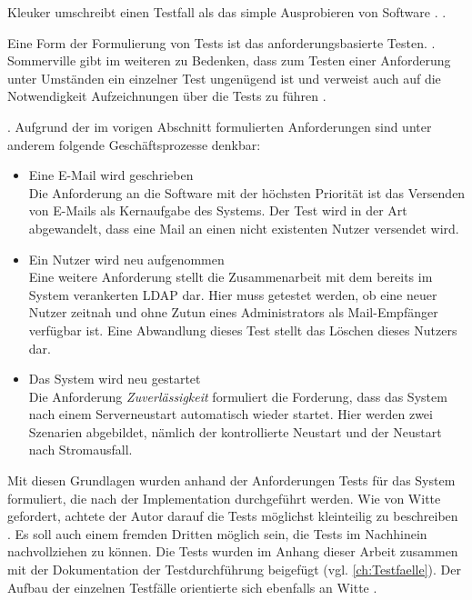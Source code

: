 Kleuker umschreibt einen Testfall als das simple Ausprobieren von Software \citep[vgl.][26]{Kleuker2019}. 
 \citep[][26]{Kleuker2019}.

Eine Form der Formulierung von Tests ist das anforderungsbasierte Testen.
 \citep[][266]{Sommerville2012}.
Sommerville gibt im weiteren zu Bedenken, dass zum Testen einer Anforderung unter Umständen ein einzelner Test ungenügend ist und verweist auch auf die Notwendigkeit Aufzeichnungen über die Tests zu führen \citep[vgl.][27]{Kleuker2019}.

 \citep[][161]{Witte2019}. Aufgrund der im vorigen Abschnitt formulierten Anforderungen sind unter anderem folgende Geschäftsprozesse denkbar:
\begin{itemize}
	\item Eine E-Mail wird geschrieben\\
	Die Anforderung an die Software mit der höchsten Priorität ist das Versenden von E-Mails als Kernaufgabe des Systems. Der Test wird  in der Art abgewandelt, dass eine Mail an einen nicht existenten Nutzer versendet wird.
	\item Ein Nutzer wird neu aufgenommen\\
	Eine weitere Anforderung stellt die Zusammenarbeit mit dem bereits im System verankerten LDAP dar. Hier muss getestet werden, ob eine neuer Nutzer zeitnah und ohne Zutun eines Administrators als Mail-Empfänger verfügbar ist. Eine Abwandlung dieses Test stellt das Löschen dieses Nutzers dar.
	\item Das System wird neu gestartet \\
	Die Anforderung \textit{Zuverlässigkeit} formuliert die Forderung, dass das System nach einem Serverneustart automatisch wieder startet. Hier werden zwei Szenarien abgebildet, nämlich der kontrollierte Neustart und der Neustart nach Stromausfall.
\end{itemize}


Mit diesen Grundlagen wurden anhand der Anforderungen Tests für das System formuliert, die nach der Implementation durchgeführt werden. 
Wie von Witte gefordert, achtete der Autor darauf die Tests möglichst kleinteilig zu beschreiben \citep[vgl.][S. 162 f.]{Witte2019}. Es soll auch einem fremden Dritten möglich sein, die Tests im Nachhinein nachvollziehen zu können. 
Die Tests wurden im Anhang dieser Arbeit zusammen mit der Dokumentation der Testdurchführung beigefügt (vgl. \autoref{ch:Testfaelle}). Der Aufbau der einzelnen Testfälle orientierte sich ebenfalls an Witte \citep[vgl.][162]{Witte2019}.


